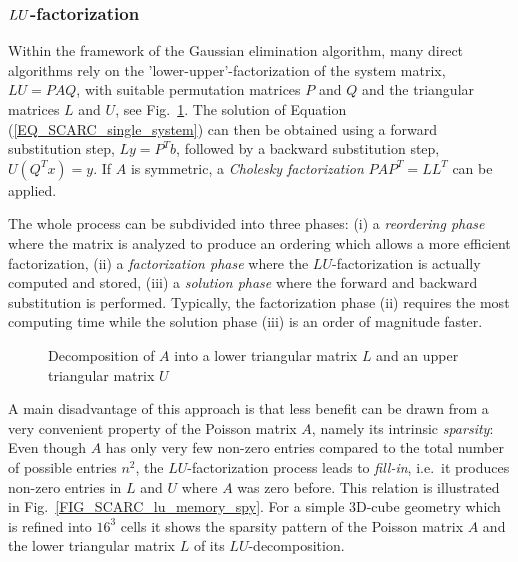 \subsubsection{$\boldmath{LU}$-factorization}
\label{SEC_SCARC_lu_decomposition}
Within the framework of the Gaussian elimination algorithm, many direct algorithms rely on the 'lower-upper'-factorization of the system matrix, $LU = PAQ$, 
with suitable permutation matrices $P$ and $Q$ and the triangular matrices $L$ and $U$, see Fig.~\ref{FIG_SCARC_lu_decomposition}. 
The solution of Equation (\ref{EQ_SCARC_single_system}) can then be obtained using a forward substitution step, $Ly=P^Tb$, followed by a backward substitution step, $U(Q^Tx)=y$.
If $A$ is symmetric, a {\it Cholesky factorization} $PAP^T=LL^T$ can be applied.

The whole process can be subdivided into three phases: 
(i) a {\it reordering phase}  where the matrix is analyzed to produce an ordering which allows a more efficient factorization,
(ii) a {\it factorization phase} where the $LU$-factorization is actually computed and stored, 
(iii) a {\it solution phase} where the forward and backward substitution is performed.
Typically, the factorization phase (ii) requires the most computing time while the solution phase (iii) is an order of magnitude faster.

\begin{figure}[ht]
\begin{center}

\end{center}
\caption{Decomposition of $A$ into a lower triangular matrix $L$ and an upper triangular matrix $U$}
\label{FIG_SCARC_lu_decomposition}
\end{figure}


A main disadvantage of this approach is that less benefit can be drawn from a very convenient property of 
the Poisson matrix $A$, namely its intrinsic {\it sparsity}:
Even though $A$ has only very few non-zero entries compared to the total number of possible entries $n^2$, 
the $LU$-factorization process leads to {\it fill-in}, i.e.\ it produces non-zero entries in $L$ and $U$ where $A$ was zero before.
This relation is illustrated in Fig.~\ref{FIG_SCARC_lu_memory_spy}.
For a simple 3D-cube geometry which is refined into $16^3$ cells it shows the sparsity pattern of the Poisson matrix $A$
and the lower triangular matrix $L$ of its $LU$-decomposition.

